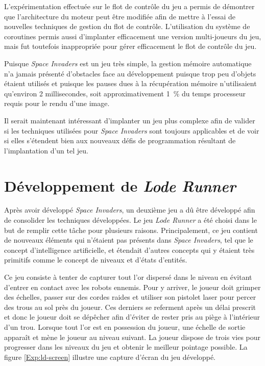 \documentclass[12pt,twoside,letterpaper,francais]{book}
\begin{document}
L'expérimentation effectuée sur le flot de contrôle du jeu a permis de
démontrer que l'architecture du moteur peut être modifiée afin de
mettre à l'essai de nouvelles techniques de gestion du flot de
contrôle. L'utilisation du système de coroutines permis aussi
d'implanter efficacement une version multi-joueurs du jeu, mais fut
toutefois inappropriée pour gérer efficacement le flot de contrôle du
jeu.

Puisque \textit{Space Invaders} est un jeu très simple, la gestion mémoire automatique n'a
jamais présenté d'obstacles face au dévelop\-pement puisque trop peu
d'objets étaient utilisés et puisque les pauses dues à la récupération
mémoire n'utilisaient qu'environ 2 millisecondes, soit
approximativement 1~\% du temps processeur requis pour le rendu d'une
image.

Il serait maintenant intéressant d'implanter un jeu plus complexe afin
de valider si les techniques utilisées pour \textit{Space Invaders}
sont toujours applicables et de voir si elles s'étendent bien aux
nouveaux défis de programmation résultant de l'implantation d'un tel
jeu.


\FloatBarrier
\section{Dévelop\-pement de \textit{Lode Runner}} \label{Exp:ld}
Après avoir développé \textit{Space Invaders}, un deuxième jeu a dû
être développé afin de consolider les techniques développées. Le jeu
\textit{Lode Runner} a été choisi dans le but de remplir cette tâche
pour plusieurs raisons. Principalement, ce jeu contient de nouveaux
éléments qui n'étaient pas présents dans \textit{Space Invaders}, tel
que le concept d'intelligence artificielle, et étendait d'autres
concepts qui y étaient très primitifs comme le concept de niveaux et
d'états d'entités.

Ce jeu consiste à tenter de capturer tout l'or dispersé dans le niveau
en évitant d'entrer en contact avec les robots ennemis. Pour y
arriver, le joueur doit grimper des échelles, passer sur des cordes
raides et utiliser son pistolet laser pour percer des trous au sol
près du joueur. Ces derniers se referment après un délai prescrit et
donc le joueur doit se dépêcher afin d'éviter de rester pris au piège
à l'intérieur d'un trou. Lorsque tout l'or est en possession du
joueur, une échelle de sortie apparaît et mène le joueur au niveau
suivant. La joueur dispose de trois vies pour progresser dans les
niveaux du jeu et obtenir le meilleur pointage possible. La figure
\ref{Exp:ld-screen} illustre une capture d'écran du jeu développé.\\
\end{document}
